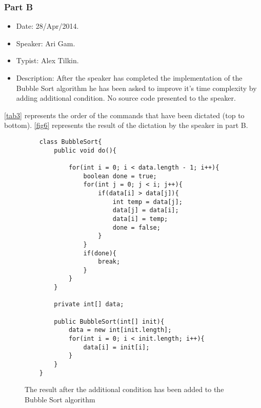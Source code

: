\subsubsection{Part B}
\begin{itemize}
	\item Date: 28/Apr/2014.
	\item Speaker: Ari Gam.
	\item Typist: Alex Tilkin.
	\item Description: After the speaker has completed the implementation of the Bubble Sort algorithm he has been asked to improve it's time complexity by adding additional condition. No source code presented to the speaker.
\end{itemize}
\autoref{tab3} represents the order of the commands that have been dictated (top to bottom). \autoref{fig6} represents the result of the dictation by the speaker in part B.
\begin{figure}[H]
	\begin{lstlisting}
	class BubbleSort{
		public void do(){
			
			for(int i = 0; i < data.length - 1; i++){
				boolean done = true;
				for(int j = 0; j < i; j++){
					if(data[i] > data[j]){
						int temp = data[j];
						data[j] = data[i];
						data[i] = temp;
						done = false;
					}
				}
				if(done){
					break;
				}
			}
		}
		
		private int[] data;
		
		public BubbleSort(int[] init){
			data = new int[init.length];
			for(int i = 0; i < init.length; i++){
				data[i] = init[i];
			}
		}
	}
	\end{lstlisting}
	\caption{The result after the additional condition has been  added to the Bubble Sort algorithm}
	\label{fig6}
\end{figure}
